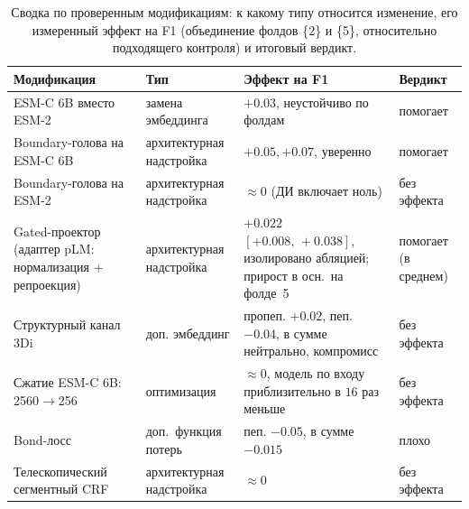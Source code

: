 \documentclass{article}
\begin{document}
\begin{table}[htbp]\centering
\caption{Сводка по проверенным модификациям: к какому типу относится изменение, его измеренный эффект на F1 (объединение фолдов \{2\} и \{5\}, относительно подходящего контроля) и итоговый вердикт.}
\label{tab:verdict}
\small
\begin{tabular}{p{4.7cm} p{2.9cm} p{4.7cm} p{2.6cm}}
\hline
\textbf{Модификация} & \textbf{Тип} & \textbf{Эффект на F1} & \textbf{Вердикт} \\
\hline
ESM-C 6B вместо ESM-2 & замена эмбеддинга & $+0.03$, неустойчиво по фолдам & помогает \\
Boundary-голова на ESM-C 6B & архитектурная надстройка & ${+}0.05, +0.07$, уверенно & помогает \\
Boundary-голова на ESM-2 & архитектурная надстройка & $\approx 0$ (ДИ включает ноль) & без эффекта \\
Gated-проектор (адаптер pLM: нормализация + репроекция) & архитектурная надстройка & $+0.022$ $[+0.008,\,+0.038]$, изолировано абляцией; прирост в осн.\ на фолде~5 & помогает (в среднем) \\
Структурный канал 3Di & доп. эмбеддинг & пропеп. ${+}0.02$, пеп. ${-}0.04$, в сумме нейтрально, компромисс & без эффекта \\
Сжатие ESM-C 6B: 2560$\to$256 & оптимизация & $\approx 0$, модель по входу приблизительно в $16$ раз меньше & без эффекта \\
Bond-лосс & доп.\ функция потерь & пеп. ${-}0.05$, в сумме ${-}0.015$ & плохо \\
Телескопический сегментный CRF & архитектурная надстройка & $\approx 0$ & без эффекта \\
\hline
\end{tabular}
\end{table}
\end{document}

